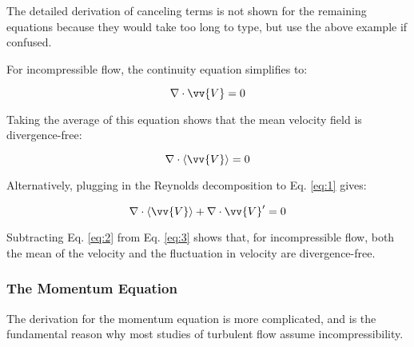 \documentclass[10pt]{article}
\newcommand{\beq}{\begin{equation}}
\newcommand{\eeq}{\end{equation}}
\newcommand{\la}{\langle}
\newcommand{\ra}{\rangle}
\newcounter{subsubsubsection}[subsubsection]
\begin{document}
\begin{flushleft}
The detailed derivation of canceling terms is not shown for the remaining equations because they would take too long to type, but use the above example if confused. 


For incompressible flow, the continuity equation simplifies to:

\beq
\label{eq:1}
\nabla\cdot\vv{V}=0
\eeq

Taking the average of this equation shows that the mean velocity field is divergence-free:

\beq
\label{eq:2}
\nabla\cdot\la\vv{V}\ra=0
\eeq

Alternatively, plugging in the Reynolds decomposition to Eq. \eqref{eq:1} gives:

\beq
\label{eq:3}
\nabla\cdot\la\vv{V}\ra+\nabla\cdot\vv{V}'=0
\eeq

Subtracting Eq. \eqref{eq:2} from Eq. \eqref{eq:3} shows that, for incompressible flow, both the mean of the velocity and the fluctuation in velocity are divergence-free. 


\subsubsection{The Momentum Equation}
The derivation for the momentum equation is more complicated, and is the fundamental reason why most studies of turbulent flow assume incompressibility.


\end{flushleft}
\end{document}
